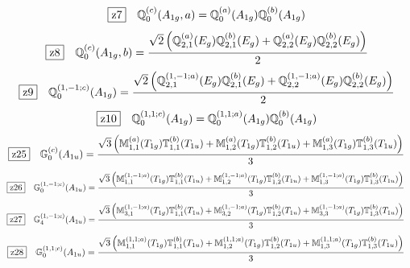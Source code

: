 \documentclass[fleqn,10pt,landscape]{jsarticle}
\begin{document}
\begin{dmath*}
\hspace*{3mm}\fbox{z7}\quad \mathbb{Q}_{0}^{(c)}(A_{1g},a)=\mathbb{Q}_{0}^{(a)}(A_{1g}) \mathbb{Q}_{0}^{(b)}(A_{1g})
\end{dmath*}
\begin{dmath*}
\hspace*{3mm}\fbox{z8}\quad \mathbb{Q}_{0}^{(c)}(A_{1g},b)=\frac{\sqrt{2} \left(\mathbb{Q}_{2,1}^{(a)}(E_{g}) \mathbb{Q}_{2,1}^{(b)}(E_{g}) + \mathbb{Q}_{2,2}^{(a)}(E_{g}) \mathbb{Q}_{2,2}^{(b)}(E_{g})\right)}{2}
\end{dmath*}
\begin{dmath*}
\hspace*{3mm}\fbox{z9}\quad \mathbb{Q}_{0}^{(1,-1;c)}(A_{1g})=\frac{\sqrt{2} \left(\mathbb{Q}_{2,1}^{(1,-1;a)}(E_{g}) \mathbb{Q}_{2,1}^{(b)}(E_{g}) + \mathbb{Q}_{2,2}^{(1,-1;a)}(E_{g}) \mathbb{Q}_{2,2}^{(b)}(E_{g})\right)}{2}
\end{dmath*}
\begin{dmath*}
\hspace*{3mm}\fbox{z10}\quad \mathbb{Q}_{0}^{(1,1;c)}(A_{1g})=\mathbb{Q}_{0}^{(1,1;a)}(A_{1g}) \mathbb{Q}_{0}^{(b)}(A_{1g})
\end{dmath*}
\begin{dmath*}
\hspace*{3mm}\fbox{z25}\quad \mathbb{G}_{0}^{(c)}(A_{1u})=\frac{\sqrt{3} \left(\mathbb{M}_{1,1}^{(a)}(T_{1g}) \mathbb{T}_{1,1}^{(b)}(T_{1u}) + \mathbb{M}_{1,2}^{(a)}(T_{1g}) \mathbb{T}_{1,2}^{(b)}(T_{1u}) + \mathbb{M}_{1,3}^{(a)}(T_{1g}) \mathbb{T}_{1,3}^{(b)}(T_{1u})\right)}{3}
\end{dmath*}
\begin{dmath*}
\hspace*{3mm}\fbox{z26}\quad \mathbb{G}_{0}^{(1,-1;c)}(A_{1u})=\frac{\sqrt{3} \left(\mathbb{M}_{1,1}^{(1,-1;a)}(T_{1g}) \mathbb{T}_{1,1}^{(b)}(T_{1u}) + \mathbb{M}_{1,2}^{(1,-1;a)}(T_{1g}) \mathbb{T}_{1,2}^{(b)}(T_{1u}) + \mathbb{M}_{1,3}^{(1,-1;a)}(T_{1g}) \mathbb{T}_{1,3}^{(b)}(T_{1u})\right)}{3}
\end{dmath*}
\begin{dmath*}
\hspace*{3mm}\fbox{z27}\quad \mathbb{G}_{4}^{(1,-1;c)}(A_{1u})=\frac{\sqrt{3} \left(\mathbb{M}_{3,1}^{(1,-1;a)}(T_{1g}) \mathbb{T}_{1,1}^{(b)}(T_{1u}) + \mathbb{M}_{3,2}^{(1,-1;a)}(T_{1g}) \mathbb{T}_{1,2}^{(b)}(T_{1u}) + \mathbb{M}_{3,3}^{(1,-1;a)}(T_{1g}) \mathbb{T}_{1,3}^{(b)}(T_{1u})\right)}{3}
\end{dmath*}
\begin{dmath*}
\hspace*{3mm}\fbox{z28}\quad \mathbb{G}_{0}^{(1,1;c)}(A_{1u})=\frac{\sqrt{3} \left(\mathbb{M}_{1,1}^{(1,1;a)}(T_{1g}) \mathbb{T}_{1,1}^{(b)}(T_{1u}) + \mathbb{M}_{1,2}^{(1,1;a)}(T_{1g}) \mathbb{T}_{1,2}^{(b)}(T_{1u}) + \mathbb{M}_{1,3}^{(1,1;a)}(T_{1g}) \mathbb{T}_{1,3}^{(b)}(T_{1u})\right)}{3}
\end{dmath*}
\end{document}
